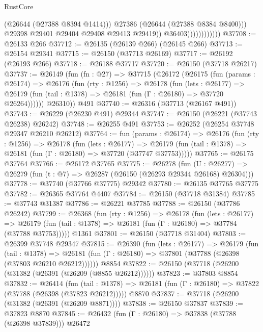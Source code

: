 \begin{lexlean}{RustCore}
\begin{coremodule}
                                    (@26644 (@27388 @8394 @1414)))
                                  @27386
                                  (@26644 (@27388 @8384 @8400)))
                                @29398
                                @29401
                                @29404
                                @29408
                                @29413
                                @29419))
                            @36403))))))))))))
@37708 := @26133 @266
@37712 := @26135 (@26139 @266) (@26145 @266)
@37713 := @26154 @29341
@37715 := @26150 (@37713 @26169)
@37717 := @26192 (@26193 @266)
@37718 := @26188 @37717
@37720 := @26150 (@37718 @26217)
@37737 := @26149
    (fun (fn : @27) =>
    @37715
      (@26172
        (@26175
          (fun (params : @26174) =>
          @26176
            (fun (rty : @1256) =>
            @26178
              (fun (lets : @26177) =>
              @26179 (fun (tail : @1378) => @26181 (fun (Γ : @26180) => @37720 @26264))))))
        @26310))
    @491
@37740 := @26316 (@37713 (@26167 @491))
@37743 := @26229 (@26230 @491) @29344
@37747 := @26150 (@26221 (@37743 @26238) @26242)
@37748 := @26255 @491
@37753 := @26252 (@26254 @37748 @29347 @26210 @26212)
@37764 := fun (params : @26174) =>
  @26176
    (fun (rty : @1256) =>
    @26178
      (fun (lets : @26177) =>
      @26179 (fun (tail : @1378) => @26181 (fun (Γ : @26180) => @37720 (@37747 @37753)))))
@37765 := @26175 @37764
@37766 := @26172 @37765
@37775 := @26278
    (fun (U : @26277) => @26279 (fun (t : @7) => @26287 (@26150 (@26293 @29344 @26168) @26304)))
@37778 := @37740 (@37766 @37775) @29342
@37780 := @26135 @37765 @37775
@37782 := @26365 @37764 @4407
@37784 := @26150 (@37718 @31384)
@37785 := @37743 @31387
@37786 := @26221 @37785
@37788 := @26150 (@37786 @26242)
@37799 := @26368
    (fun (rty : @1256) =>
    @26178
      (fun (lets : @26177) =>
      @26179 (fun (tail : @1378) => @26181 (fun (Γ : @26180) => @37784 (@37788 @37753)))))
    @1361
@37801 := @26150 (@37718 @31404)
@37803 := @26399 @37748 @29347
@37815 := @26390
    (fun (lets : @26177) =>
    @26179
      (fun (tail : @1378) =>
      @26181 (fun (Γ : @26180) => @37801 (@37788 (@26398 (@37803 @26210 @26212))))))
    @8854
@37822 := @26150 (@37718 (@26200 (@31382 (@26391 (@26209 (@8855 @26212))))))
@37823 := @37803 @8854
@37832 := @26414
    (fun (tail : @1378) => @26181 (fun (Γ : @26180) => @37822 (@37788 (@26398 (@37823 @26212)))))
    @8870
@37837 := @37718 (@26200 (@31382 (@26391 (@26209 @8871))))
@37838 := @26150 @37837
@37839 := @37823 @8870
@37845 := @26432 (fun (Γ : @26180) => @37838 (@37788 (@26398 @37839))) @26472

\end{coremodule}
\end{lexlean}
